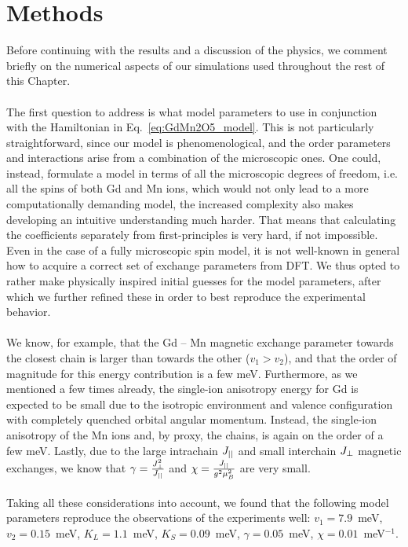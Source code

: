 \section{Methods \label{sec:GdMn2O5_methods}}
Before continuing with the results and a discussion of the physics, we comment briefly on the numerical aspects of our simulations used throughout the rest of this Chapter.\\\\
The first question to address is what model parameters to use in conjunction with the Hamiltonian in Eq.~\eqref{eq:GdMn2O5_model}.
This is not particularly straightforward, since our model is phenomenological, and the order parameters and interactions arise from a combination of the microscopic ones.
One could, instead, formulate a model in terms of all the microscopic degrees of freedom, i.e. all the spins of both Gd and Mn ions, which would not only lead to a more computationally demanding model, the increased complexity also makes developing an intuitive understanding much harder.
That means that calculating the coefficients separately from first-principles is very hard, if not impossible. Even in the case of a fully microscopic spin model, it is not well-known in general how to acquire a correct set of exchange parameters from DFT.
We thus opted to rather make physically inspired initial guesses for the model parameters, after which we further refined these in order to best reproduce the experimental behavior.
\\\\
We know, for example, that the Gd -- Mn magnetic exchange parameter towards the closest chain is larger than towards the other ($v_1>v_2$), and that the order of magnitude for this energy contribution is a few meV.
Furthermore, as we mentioned a few times already, the single-ion anisotropy energy for Gd is expected to be small due to the isotropic environment and valence configuration with completely quenched orbital angular momentum.
Instead, the single-ion anisotropy of the Mn ions and, by proxy, the chains, is again on the order of a few meV.
Lastly, due to the large intrachain $J_{||}$ and small interchain $J_{\perp}$ magnetic exchanges, we know that $\gamma = \frac{J_{\perp}^2}{J_{||}}$ and $\chi = \frac{J_{||}}{g^2\mu_B^2}$ are very small.
\\\\
Taking all these considerations into account, we found that the following model parameters reproduce the observations of the experiments well:  
$v_1 = 7.9$~meV, $v_2 = 0.15$~meV, $K_L = 1.1$~meV, $K_S = 0.09$~meV, $\gamma = 0.05$~meV, $\chi=0.01$~meV$^{-1}$.
